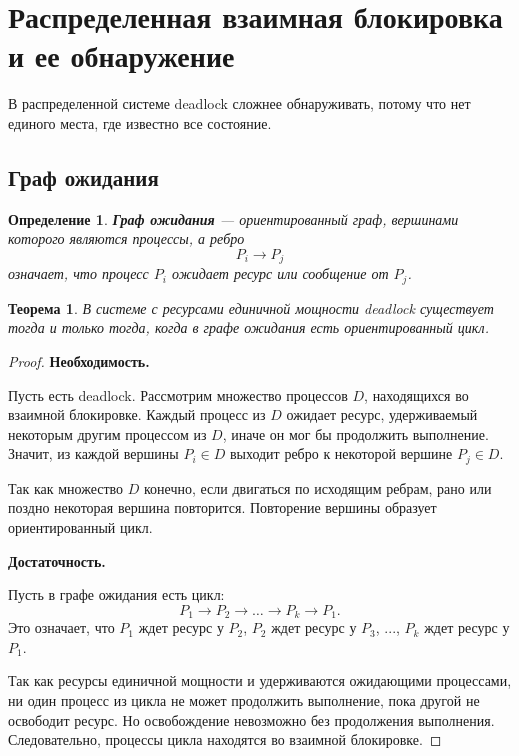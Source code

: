 \documentclass[12pt,a4paper]{article}
\newtheorem{definition}{Определение}
\newtheorem{theorem}{Теорема}
\begin{document}
\section{Распределенная взаимная блокировка и ее обнаружение}

В распределенной системе deadlock сложнее обнаруживать, потому что нет единого места, где известно все состояние.

\subsection{Граф ожидания}

\begin{definition}
\textbf{Граф ожидания} --- ориентированный граф, вершинами которого являются процессы, а ребро
\[
P_i \rightarrow P_j
\]
означает, что процесс $P_i$ ожидает ресурс или сообщение от $P_j$.
\end{definition}

\begin{theorem}
В системе с ресурсами единичной мощности deadlock существует тогда и только тогда, когда в графе ожидания есть ориентированный цикл.
\end{theorem}

\begin{proof}
\textbf{Необходимость.}

Пусть есть deadlock. Рассмотрим множество процессов $D$, находящихся во взаимной блокировке. Каждый процесс из $D$ ожидает ресурс, удерживаемый некоторым другим процессом из $D$, иначе он мог бы продолжить выполнение. Значит, из каждой вершины $P_i \in D$ выходит ребро к некоторой вершине $P_j \in D$.

Так как множество $D$ конечно, если двигаться по исходящим ребрам, рано или поздно некоторая вершина повторится. Повторение вершины образует ориентированный цикл.

\textbf{Достаточность.}

Пусть в графе ожидания есть цикл:
\[
P_1 \rightarrow P_2 \rightarrow \dots \rightarrow P_k \rightarrow P_1.
\]
Это означает, что $P_1$ ждет ресурс у $P_2$, $P_2$ ждет ресурс у $P_3$, ..., $P_k$ ждет ресурс у $P_1$.

Так как ресурсы единичной мощности и удерживаются ожидающими процессами, ни один процесс из цикла не может продолжить выполнение, пока другой не освободит ресурс. Но освобождение невозможно без продолжения выполнения. Следовательно, процессы цикла находятся во взаимной блокировке.
\end{proof}
\end{document}
